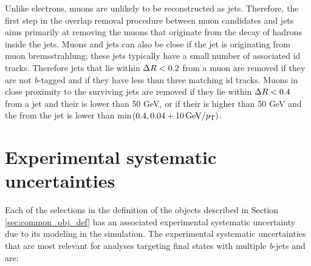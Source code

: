 Unlike electrons, muons are unlikely to be reconstructed as jets. Therefore, the first step in the overlap removal procedure between muon candidates and jets 
aims primarily at removing the muons that originate from the decay of hadrons inside the jets. 
Muons and jets can also be close if the jet is originating from muon bremsstrahlung; these jets typically have a small number of associated \gls{id} tracks.
Therefore jets that lie within $\Delta R < 0.2$ from a muon are removed if they are not \textit{b}-tagged and if they have less than three matching \gls{id} tracks. 
Muons in close proximity to the surviving jets are removed 
if they lie within $\Delta R<0.4$ from a jet and their \pt is lower than 50 GeV, or if their \pt is higher than 50 GeV and the \dR from the jet 
is lower than min$(0.4, 0.04 + 10 \, {\rm{GeV}}/p_{\rm T})$. 

\section{Experimental systematic uncertainties}
\label{sec:common_syst}

Each of the selections in the definition of the objects described in Section \ref{sec:common_obj_def} has an associated experimental systematic uncertainty due to its modeling in the simulation. 
The experimental systematic uncertainties that are most relevant for analyses targeting final states with multiple \textit{b}-jets and \met are:

